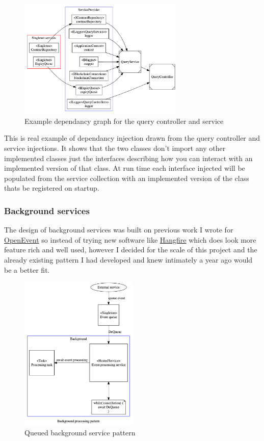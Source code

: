 \documentclass[12pt]{article}
\begin{document}
\begin{figure}[H]
\caption{Example dependancy graph for the query controller and service}
\centering
\includegraphics[width=0.7\textwidth,height=0.7\textheight,keepaspectratio]{images/patterns/DI-example}
\end{figure}

This is real example of dependancy injection drawn from the query controller and service injections. It shows that the two classes don't import any other implemented classes just the interfaces describing how you can interact with an implemented version of that class. At run time each interface injected will be populated from the service collection with an implemented version of the class thats be registered on startup.

\subsubsection{Background services}

The design of background services was built on previous work I wrote for \href{https://github.com/mrharrisonbarker/openevent}{OpenEvent} so instead of trying new software like \href{https://www.hangfire.io/}{Hangfire} which does look more feature rich and well used, however I decided for the scale of this project and the already existing pattern I had developed and knew intimately a year ago would be a better fit.

\begin{figure}[H]
\caption{Queued background service pattern}
\centering
\includegraphics[width=0.5\textwidth,height=0.5\textheight,keepaspectratio]{images/patterns/background-processing-pattern}
\end{figure}
\end{document}
